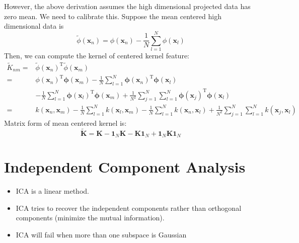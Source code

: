 \documentclass{article}
\begin{document}
However, the above derivation assumes the high dimensional projected data has zero mean. We need to calibrate this. Suppose the mean centered high dimensional data is 
\begin{equation}
\widetilde{\phi}\left(\mathbf{x}_{n}\right)=\phi\left(\mathbf{x}_{n}\right)-\frac{1}{N} \sum_{l=1}^{N} \phi\left(\mathbf{x}_{l}\right)
\end{equation}
Then, we can compute the kernel of centered kernel feature:
\begin{equation}
\begin{aligned} \widetilde{K}_{n m}=& \widetilde{\phi}\left(\mathbf{x}_{n}\right)^{\mathrm{T}} \widetilde{\phi}\left(\mathbf{x}_{m}\right) \\=& \phi\left(\mathbf{x}_{n}\right)^{\mathrm{T}} \boldsymbol{\phi}\left(\mathbf{x}_{m}\right)-\frac{1}{N} \sum_{l=1}^{N} \boldsymbol{\phi}\left(\mathbf{x}_{n}\right)^{\mathrm{T}} \boldsymbol{\phi}\left(\mathbf{x}_{l}\right) \\ &-\frac{1}{N} \sum_{l=1}^{N} \boldsymbol{\phi}\left(\mathbf{x}_{l}\right)^{\mathrm{T}} \boldsymbol{\phi}\left(\mathbf{x}_{m}\right)+\frac{1}{N^{2}} \sum_{j=1}^{N} \sum_{l=1}^{N} \boldsymbol{\phi}\left(\mathbf{x}_{j}\right)^{\mathrm{T}} \boldsymbol{\phi}\left(\mathbf{x}_{l}\right) \\=& k\left(\mathbf{x}_{n}, \mathbf{x}_{m}\right)-\frac{1}{N} \sum_{l=1}^{N} k\left(\mathbf{x}_{l}, \mathbf{x}_{m}\right)-\frac{1}{N} \sum_{l=1}^{N} k\left(\mathbf{x}_{n}, \mathbf{x}_{l}\right)+\frac{1}{N^{2}} \sum_{j=1}^{N} \sum_{l=1}^{N} k\left(\mathbf{x}_{j}, \mathbf{x}_{l}\right) \end{aligned}
\end{equation}
Matrix form of mean centered kernel is:
\begin{equation}
\tilde{\mathbf{K}}=\mathbf{K}-\mathbf{1}_{N} \mathbf{K}-\mathbf{K} \mathbf{1}_{N}+\mathbf{1}_{N} \mathbf{K} \mathbf{1}_{N}
\end{equation}

\section{Independent Component Analysis}
\begin{itemize}
  \item ICA is a linear method.
 \item ICA tries to recover the independent components rather than orthogonal components (minimize the mutual information).
\item ICA will fail when more than one subspace is Gaussian
\end{itemize}
\end{document}
